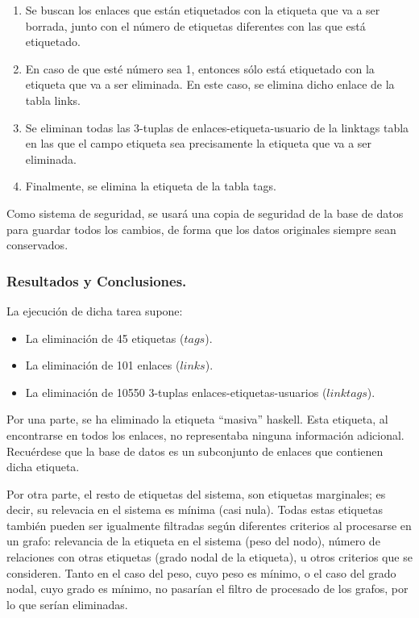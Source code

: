 \begin{enumerate}
\item    Se buscan los enlaces que están etiquetados con la etiqueta que va a ser borrada, junto con el número de etiquetas diferentes con las que está etiquetado.
\item    En caso de que esté número sea 1, entonces sólo está etiquetado con la etiqueta que va a ser eliminada. En este caso, se elimina dicho enlace de la tabla links.
\item    Se eliminan todas las 3-tuplas de enlaces-etiqueta-usuario de la linktags tabla en las que el campo etiqueta sea precisamente la etiqueta que va a ser eliminada.
\item    Finalmente, se elimina la etiqueta de la tabla tags.
\end{enumerate}

Como sistema de seguridad, se usará una copia de seguridad de la base de datos para guardar todos los cambios, de forma que los datos originales siempre sean conservados.



\subsubsection{Resultados y Conclusiones.}

La ejecución de dicha tarea supone:
\begin{itemize}
\item    La eliminación de 45 etiquetas ($tags$).
\item    La eliminación de 101 enlaces ($links$).
\item    La eliminación de 10550 3-tuplas enlaces-etiquetas-usuarios ($linktags$).
\end{itemize}
Por una parte, se ha eliminado la etiqueta “masiva” haskell. Esta etiqueta, al encontrarse en todos los enlaces, no representaba ninguna información adicional. Recuérdese que la base de datos es un subconjunto de enlaces que contienen dicha etiqueta.

Por otra parte, el resto de etiquetas del sistema, son etiquetas marginales; es decir, su relevacia en el sistema es mínima (casi nula). Todas estas etiquetas también pueden ser igualmente filtradas según diferentes criterios al procesarse en un grafo: relevancia de la etiqueta en el sistema (peso del nodo), número de relaciones con otras etiquetas (grado nodal de la etiqueta), u otros criterios que se consideren. Tanto en el caso del peso, cuyo peso es mínimo, o el caso del grado nodal, cuyo grado es mínimo, no pasarían el filtro de procesado de los grafos, por lo que serían eliminadas.

